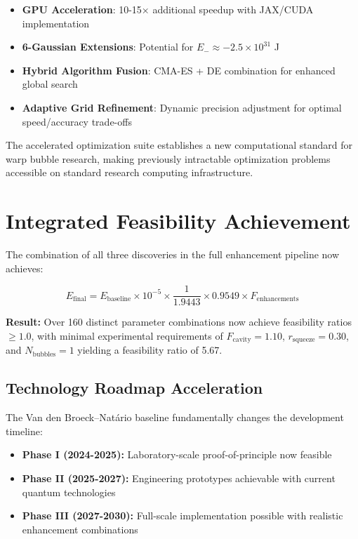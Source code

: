 \documentclass[11pt]{article}
\begin{document}
\begin{itemize}
\item \textbf{GPU Acceleration}: 10-15× additional speedup with JAX/CUDA implementation
\item \textbf{6-Gaussian Extensions}: Potential for $E_- \approx -2.5 \times 10^{31}$ J
\item \textbf{Hybrid Algorithm Fusion}: CMA-ES + DE combination for enhanced global search
\item \textbf{Adaptive Grid Refinement}: Dynamic precision adjustment for optimal speed/accuracy trade-offs
\end{itemize}

The accelerated optimization suite establishes a new computational standard for warp bubble research, making previously intractable optimization problems accessible on standard research computing infrastructure.

\section{Integrated Feasibility Achievement}

The combination of all three discoveries in the full enhancement pipeline now achieves:

\begin{equation}
E_{\text{final}} = E_{\text{baseline}} \times 10^{-5} \times \frac{1}{1.9443} \times 0.9549 \times F_{\text{enhancements}}
\end{equation}

\textbf{Result:} Over 160 distinct parameter combinations now achieve feasibility ratios $\geq 1.0$, with minimal experimental requirements of $F_{\text{cavity}} = 1.10$, $r_{\text{squeeze}} = 0.30$, and $N_{\text{bubbles}} = 1$ yielding a feasibility ratio of 5.67.

\subsection{Technology Roadmap Acceleration}
The Van den Broeck–Natário baseline fundamentally changes the development timeline:
\begin{itemize}
\item \textbf{Phase I (2024-2025):} Laboratory-scale proof-of-principle now feasible
\item \textbf{Phase II (2025-2027):} Engineering prototypes achievable with current quantum technologies  
\item \textbf{Phase III (2027-2030):} Full-scale implementation possible with realistic enhancement combinations
\end{itemize}
\end{document}
